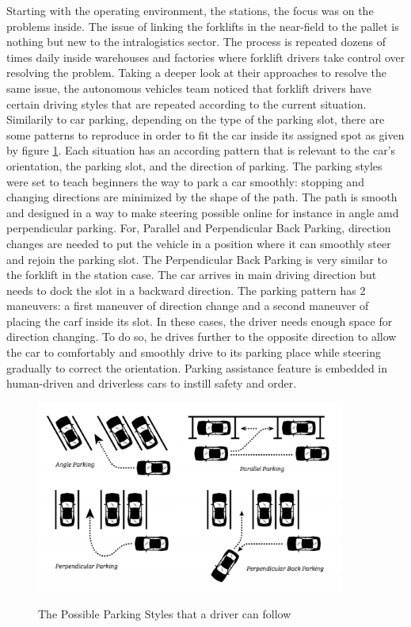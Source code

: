 Starting with the operating environment, the stations, the focus was on the problems inside. The issue of linking 
the forklifts in the near-field to the pallet is nothing but new to the intralogistics sector. 
The process is repeated dozens of times daily inside warehouses and factories where forklift drivers take control over 
resolving the problem. Taking a deeper look at their approaches to resolve the same issue, the autonomous vehicles team 
noticed that forklift drivers have certain driving styles that are repeated according to the current situation.
Similarily to car parking, depending on the type of the parking slot, there are some patterns to reproduce in order to fit 
the car inside its assigned spot as given by figure \ref{Parking_Styles}. 
Each situation has an according pattern that is relevant to the car's orientation, the parking slot, 
and the direction of parking. The parking styles were set to teach beginners the way to park a car 
smoothly: stopping and changing directions are minimized by the shape of the path.
The path is smooth and designed in a way to make steering possible online for instance in angle 
amd perpendicular parking. For, Parallel and Perpendicular Back Parking, direction changes 
are needed to  put the vehicle in a position where it can smoothly steer and rejoin the parking slot.
The Perpendicular Back Parking is very similar to the forklift in the station case.
The car arrives in main driving direction but needs to dock the slot in a backward direction. 
The parking pattern has 2 maneuvers: a first maneuver of direction change and a second maneuver of 
placing the carf inside its slot.
In these cases, the driver needs 
enough space for direction changing. To do so, he drives further to the opposite direction to allow 
the car to comfortably and smoothly drive to its parking place while steering gradually to correct the orientation.
Parking assistance feature is embedded in human-driven and driverless cars to instill safety and order.

\begin{figure}
    [H]
    \begin{center}
    \includegraphics[width=4in]{images/Chap2/perpendicular-parking-a-lot-scaled.jpg}\\
    \caption{The Possible Parking Styles that a driver can follow}
    \label{Parking_Styles}
    \end{center}
\end{figure}

